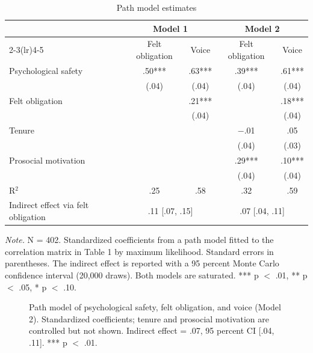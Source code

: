 \documentclass[12pt]{article}
\begin{document}
\begin{table}[p]
\centering
\begin{threeparttable}
\caption{Path model estimates}
\label{tab:path}
\begin{tabular}{lcccc}
\toprule
 & \multicolumn{2}{c}{Model 1} & \multicolumn{2}{c}{Model 2} \\
\cmidrule(lr){2-3}\cmidrule(lr){4-5}
 & Felt obligation & Voice & Felt obligation & Voice \\
\midrule
Psychological safety & .50*** & .63*** & .39*** & .61*** \\
 & (.04) & (.04) & (.04) & (.04) \\
Felt obligation &  & .21*** &  & .18*** \\
 &  & (.04) &  & (.04) \\
Tenure &  &  & $-$.01 & .05 \\
 &  &  & (.04) & (.03) \\
Prosocial motivation &  &  & .29*** & .10*** \\
 &  &  & (.04) & (.04) \\
\midrule
R$^2$ & .25 & .58 & .32 & .59 \\
\midrule
Indirect effect via felt obligation & \multicolumn{2}{c}{.11 [.07, .15]} & \multicolumn{2}{c}{.07 [.04, .11]} \\
\bottomrule
\end{tabular}
\begin{tablenotes}\footnotesize
\item \textit{Note.} N = 402. Standardized coefficients from a path model fitted to the correlation matrix in Table 1 by maximum likelihood. Standard errors in parentheses. The indirect effect is reported with a 95 percent Monte Carlo confidence interval (20,000 draws). Both models are saturated. *** p $<$ .01, ** p $<$ .05, * p $<$ .10.
\end{tablenotes}
\end{threeparttable}
\end{table}

\begin{figure}[!htbp]
\centering
{}
\caption{Path model of psychological safety, felt obligation, and voice (Model 2). Standardized coefficients; tenure and prosocial motivation are controlled but not shown. Indirect effect = .07, 95 percent CI [.04, .11]. *** p $<$ .01.}
\label{fig:path}
\end{figure}
\end{document}
